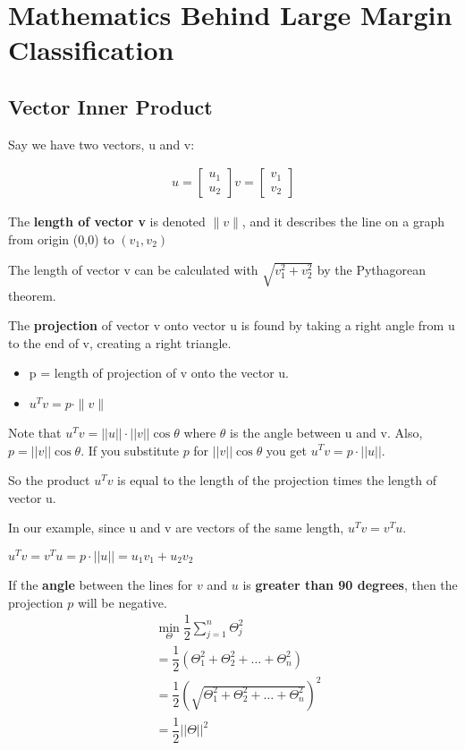 \section{Mathematics Behind Large Margin Classification}
\subsection{Vector Inner Product}
Say we have two vectors, u and v:

\begin{align*}
u = 
\begin{bmatrix}
u_1 \\ u_2
\end{bmatrix}
v = 
\begin{bmatrix}
v_1 \\ v_2
\end{bmatrix}
\end{align*}

The \textbf{length of vector v} is denoted $\parallel v\parallel$, and it describes the line on a graph from origin (0,0) to $(v_1,v_2)$

The length of vector v can be calculated with $\sqrt{v_1^2 + v_2^2}$ by the Pythagorean theorem.

The \textbf{projection} of vector v onto vector u is found by taking a right angle from u to the end of v, creating a right triangle.

\begin{itemize}
\item p = length of projection of v onto the vector u.
\item $u^Tv = p \cdot \parallel v \parallel$
\end{itemize}

Note that  $u^Tv = ||u|| \cdot ||v|| \cos \theta$ where $\theta$ is the angle between u and v. Also, $p = ||v|| \cos \theta$. If you substitute $p$ for $||v|| \cos \theta$ you get $u^Tv= p \cdot ||u||$.

So the product $u^Tv$ is equal to the length of the projection times the length of vector u.

In our example, since u and v are vectors of the same length, $u^Tv = v^Tu$.

$u^Tv = v^Tu = p \cdot ||u|| = u_1v_1 + u_2v_2$

If the \textbf{angle} between the lines for $v$ and $u$ is \textbf{greater than 90 degrees}, then the projection $p$ will be negative.
\begin{align*}
&\min_\Theta \dfrac{1}{2}\sum_{j=1}^n \Theta_j^2 \\
&= \dfrac{1}{2}(\Theta_1^2 + \Theta_2^2 + \dots + \Theta_n^2) \\
&= \dfrac{1}{2}(\sqrt{\Theta_1^2 + \Theta_2^2 + \dots + \Theta_n^2})^2 \\
&= \dfrac{1}{2}||\Theta ||^2 \\
\end{align*}

